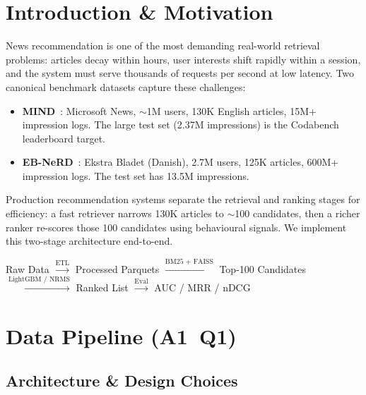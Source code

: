 \documentclass[11pt,a4paper]{article}
\begin{document}
\section{Introduction \& Motivation}

News recommendation is one of the most demanding real-world retrieval problems:
articles decay within hours, user interests shift rapidly within a session, and
the system must serve thousands of requests per second at low latency. Two
canonical benchmark datasets capture these challenges:

\begin{itemize}[noitemsep]
  \item \textbf{MIND}~\citep{wu2020mind}: Microsoft News, $\sim$1M users, 130K
        English articles, 15M+ impression logs. The large test set (2.37M
        impressions) is the Codabench leaderboard target.
  \item \textbf{EB-NeRD}~\citep{kruse2024ebnerd}: Ekstra Bladet (Danish), 2.7M
        users, 125K articles, 600M+ impression logs. The test set has 13.5M
        impressions.
\end{itemize}

Production recommendation systems separate the retrieval and ranking stages for
efficiency: a fast retriever narrows 130K articles to $\sim$100 candidates, then
a richer ranker re-scores those 100 candidates using behavioural signals. We
implement this two-stage architecture end-to-end.

\begin{keybox}
Raw Data $\xrightarrow{\text{ETL}}$ Processed Parquets $\xrightarrow{\text{BM25
+ FAISS}}$ Top-100 Candidates $\xrightarrow{\text{LightGBM / NRMS}}$ Ranked
List $\xrightarrow{\text{Eval}}$ AUC / MRR / nDCG
\end{keybox}

\section{Data Pipeline (A1~Q1)}

\subsection{Architecture \& Design Choices}
\end{document}
